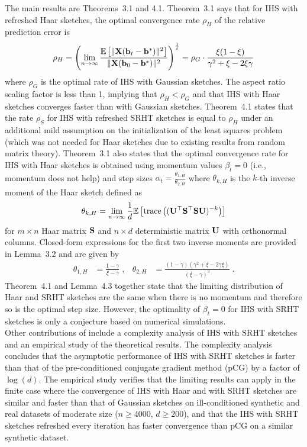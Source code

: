 The main results are Theorems~3.1 and 4.1. Theorem~3.1 says that for IHS with refreshed Haar sketches, the optimal convergence rate $\rho_H$ of the relative prediction error is
\[
\rho_H  = \left(\lim_{n\rightarrow\infty}\frac{\mathbb{E}\left[\|\mathbf{X}(\mathbf{b}_t-\mathbf{b}^*)\|^2\right]}{\|\mathbf{X}(\mathbf{b}_0-\mathbf{b}^*)\|^2}\right)^\frac{1}{t} = \rho_G\cdot\frac{\xi(1-\xi)}{\gamma^2+\xi-2\xi\gamma}
\]
where $\rho_G$ is the optimal rate of IHS with Gaussian sketches. The aspect ratio scaling factor is less than 1, implying that $\rho_H<\rho_G$ and that IHS with Haar sketches converges faster than with Gaussian sketches.  Theorem~4.1 states that the rate $\rho_S$ for IHS with refreshed SRHT sketches is equal to $\rho_H$ under an additional mild assumption on the initialization of the least squares problem (which was not needed for Haar sketches due to existing results from random matrix theory). Theorem~3.1 also states that the optimal convergence rate for IHS with Haar sketches is obtained using momentum values $\beta_t=0$ (i.e., momentum does not help) and step sizes $\alpha_t = \frac{\theta_{1,H}}{\theta_{2,H}}$ where $\theta_{k,H}$ is the $k$-th inverse moment of the Haar sketch defined as
\[
\theta_{k,H} = \lim_{n\rightarrow\infty}\frac{1}{d}\mathbb{E}\left[\mathrm{trace}\left((\mathbf{U}^\top\mathbf{S}^\top\mathbf{S}\mathbf{U})^{-k}\right)\right]
\]
for $m\times n$ Haar matrix $\mathbf{S}$ and $n\times d$ deterministic matrix $\mathbf{U}$ with orthonormal columns. Closed-form expressions for the first two inverse moments are provided in Lemma~3.2 and are given by
\begin{align*}
\theta_{1,H} &= \frac{1-\gamma}{\xi-\gamma} \;, & \theta_{2,H} &= \frac{(1-\gamma)(\gamma^2+\xi-2\gamma\xi)}{(\xi-\gamma)^3} \;.
\end{align*}
Theorem~4.1 and Lemma~4.3 together state that the limiting distribution of Haar and SRHT sketches are the same when there is no momentum and therefore so is the optimal step size. However, the optimality of $\beta_t=0$ for IHS with SRHT sketches is only a conjecture based on numerical simulations.
\\

Other contributions of \citet{Lacotte:2020} include a complexity analysis of IHS with SRHT sketches and an empirical study of the theoretical results. The complexity analysis concludes that the asymptotic performance of IHS with SRHT sketches is faster than that of the pre-conditioned conjugate gradient method (pCG) \citep{Rokhlin:2008} by a factor of $\log(d)$. The empirical study verifies that the limiting results can apply in the finite case where the convergence of IHS with Haar and with SRHT sketches are similar and faster than that of Gaussian sketches on ill-conditioned synthetic and real datasets of moderate size ($n\geq 4000$, $d\geq 200$), and that the IHS with SRHT sketches refreshed every iteration has faster convergence than pCG on a similar synthetic dataset.


